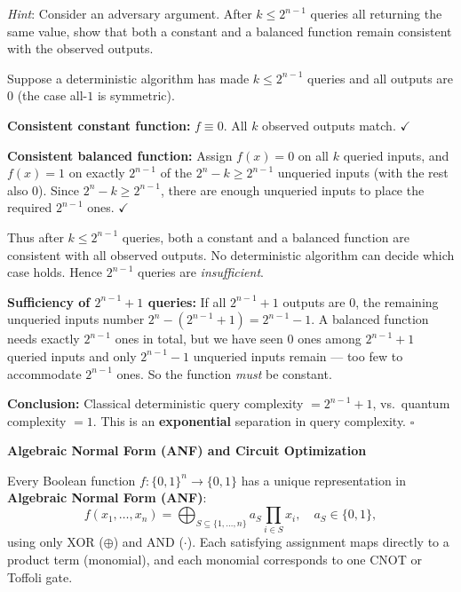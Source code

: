 \documentclass[12pt,a4paper]{exam}
\begin{document}
\begin{questions}
\begin{parts}
\textit{Hint}: Consider an adversary argument. After $k\le2^{n-1}$ queries all returning the same value, show that both a constant and a balanced function remain consistent with the observed outputs.

\begin{solution}
Suppose a deterministic algorithm has made $k\le2^{n-1}$ queries and all outputs are $0$
(the case all-$1$ is symmetric).

\textbf{Consistent constant function:} $f\equiv0$. All $k$ observed outputs match. $\checkmark$

\textbf{Consistent balanced function:} Assign $f(x)=0$ on all $k$ queried inputs, and $f(x)=1$ on
exactly $2^{n-1}$ of the $2^n-k\ge2^{n-1}$ unqueried inputs (with the rest also 0).
Since $2^n-k\ge2^{n-1}$, there are enough unqueried inputs to place the required $2^{n-1}$ ones. $\checkmark$

Thus after $k\le2^{n-1}$ queries, both a constant and a balanced function are consistent with all observed outputs. No deterministic algorithm can decide which case holds. Hence $2^{n-1}$ queries are \emph{insufficient}.

\textbf{Sufficiency of $2^{n-1}+1$ queries:} If all $2^{n-1}+1$ outputs are $0$,
the remaining unqueried inputs number $2^n-(2^{n-1}+1)=2^{n-1}-1$.
A balanced function needs exactly $2^{n-1}$ ones in total, but we have seen $0$ ones among $2^{n-1}+1$
queried inputs and only $2^{n-1}-1$ unqueried inputs remain --- too few to accommodate $2^{n-1}$ ones.
So the function \emph{must} be constant.

\textbf{Conclusion:} Classical deterministic query complexity $=2^{n-1}+1$, vs.\ quantum complexity $=1$.
This is an \textbf{exponential} separation in query complexity. $\square$
\end{solution}

\end{parts}

\newpage
\question[20] \textbf{Algebraic Normal Form (ANF) and Circuit Optimization}

Every Boolean function $f:\{0,1\}^n\to\{0,1\}$ has a unique representation in
\textbf{Algebraic Normal Form (ANF)}:
\[
f(x_1,\ldots,x_n)=\bigoplus_{S\subseteq\{1,\ldots,n\}} a_S\!\!\prod_{i\in S}\!\!x_i,
\quad a_S\in\{0,1\},
\]
using only XOR ($\oplus$) and AND ($\cdot$). Each satisfying assignment maps directly to
a product term (monomial), and each monomial corresponds to one CNOT or Toffoli gate.


\end{questions}
\end{document}
